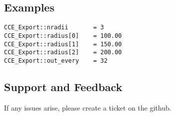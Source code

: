 \documentclass{article}
\begin{document}
\subsection{Examples}

\begin{verbatim}
CCE_Export::nradii       = 3
CCE_Export::radius[0]    = 100.00
CCE_Export::radius[1]    = 150.00
CCE_Export::radius[2]    = 200.00
CCE_Export::out_every    = 32
\end{verbatim}

\subsection{Support and Feedback}

If any issues arise, please create a ticket on the github.


\begin{thebibliography}{9}

\end{thebibliography}

\end{document}
